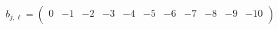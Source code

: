 \documentclass[11pt]{article}
\begin{document}
\begin{align*}
  b_{j,\ell} = 
  \left(
\begin{array}{ccccccccccc}
 0 & -1 & -2 & -3 & -4 & -5 & -6 & -7 & -8 & -9 & -10 \\
\end{array}
\right)
\end{align*}
\end{document}
